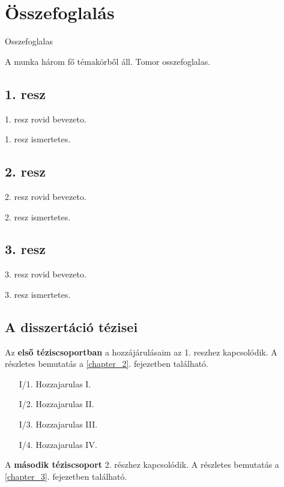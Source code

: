 
\chapter*{Összefoglalás}

Osszefoglalas

A munka három fő témakörből áll. Tomor osszefoglalas.

\section*{1. resz}

1. resz rovid bevezeto.

1. resz ismertetes.

\section*{2. resz}

2. resz rovid bevezeto.

2. resz ismertetes.

\newpage
\section*{3. resz}

3. resz rovid bevezeto.

3. resz ismertetes.
\newpage
\section*{A disszertáció tézisei}

Az \textbf{első téziscsoportban} a hozzájárulásaim az 1. reszhez kapcsolódik. A részletes bemutatás a \ref{chapter_2}. fejezetben található.


\begin{enumerate}[wide = 0pt, widest = {III/5.}, leftmargin =*]
    \item[I/1.] Hozzajarulas I.
    
    \item[I/2.] Hozzajarulas II.

    \item[I/3.] Hozzajarulas III.
    
    \item[I/4.] Hozzajarulas IV.
\end{enumerate}

\noindent
A \textbf{második téziscsoport} 2. részhez kapcsolódik. A részletes bemutatás a \ref{chapter_3}. fejezetben található.

